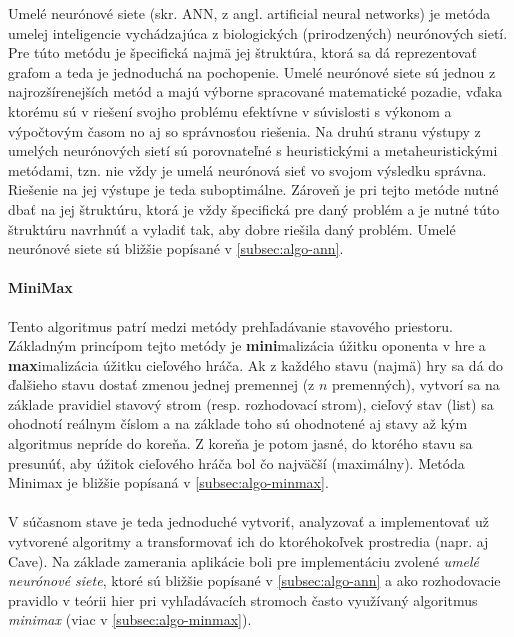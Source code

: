 Umelé neurónové siete (skr. ANN, z angl. artificial neural networks) je metóda umelej inteligencie vychádzajúca z
biologických (prirodzených) neurónových sietí.
Pre túto metódu je špecifická najmä jej štruktúra, ktorá sa dá reprezentovať grafom a teda je jednoduchá na pochopenie.
Umelé neurónové siete sú jednou z najrozšírenejších metód a majú výborne spracované matematické pozadie, vďaka ktorému
sú v riešení svojho problému efektívne v súvislosti s výkonom a výpočtovým časom no aj so správnosťou riešenia.
Na druhú stranu výstupy z umelých neurónových sietí sú porovnateľné s heuristickými a metaheuristickými metódami, tzn.
nie vždy je umelá neurónová sieť vo svojom výsledku správna.
Riešenie na jej výstupe je teda suboptimálne.
Zároveň je pri tejto metóde nutné dbať na jej štruktúru, ktorá je vždy špecifická pre daný problém a je nutné túto
štruktúru navrhnúť a vyladiť tak, aby dobre riešila daný problém.
Umelé neurónové siete sú bližšie popísané v \autoref{subsec:algo-ann}.

\paragraph{MiniMax}

Tento algoritmus patrí medzi metódy prehľadávanie stavového priestoru.
Základným princípom tejto metódy je \textbf{mini}malizácia úžitku oponenta v hre a \textbf{max}imalizácia úžitku
cieľového hráča.
Ak z každého stavu (najmä) hry sa dá do ďalšieho stavu dostať zmenou jednej premennej (z $n$ premenných),
vytvorí sa na základe pravidiel stavový strom (resp. rozhodovací strom), cieľový stav (list) sa ohodnotí reálnym číslom
a na základe toho sú ohodnotené aj stavy až kým algoritmus nepríde do koreňa.
Z koreňa je potom jasné, do ktorého stavu sa presunúť, aby úžitok cieľového hráča bol čo najväčší (maximálny).
Metóda Minimax je bližšie popísaná v \autoref{subsec:algo-minmax}.
\\
\\
V súčasnom stave je teda jednoduché vytvoriť, analyzovať a implementovať už vytvorené algoritmy a transformovať ich
do ktoréhokoľvek prostredia (napr. aj Cave).
Na základe zamerania aplikácie boli pre implementáciu zvolené \emph{umelé neurónové siete}, ktoré sú bližšie popísané v
\autoref{subsec:algo-ann} a ako rozhodovacie pravidlo v teórii hier pri vyhľadávacích stromoch často využívaný
algoritmus \emph{minimax} (viac v \autoref{subsec:algo-minmax}).
